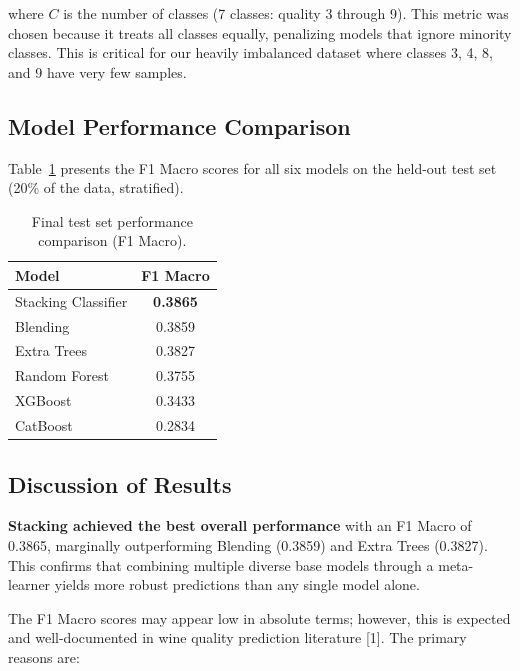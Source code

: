 \documentclass[12pt, a4paper]{article}
\begin{document}
where $C$ is the number of classes (7 classes: quality 3 through 9). This metric was chosen because it treats all classes equally, penalizing models that ignore minority classes. This is critical for our heavily imbalanced dataset where classes 3, 4, 8, and 9 have very few samples.

\subsection{Model Performance Comparison}

Table~\ref{tab:results} presents the F1 Macro scores for all six models on the held-out test set (20\% of the data, stratified).

\begin{table}[H]
\centering
\caption{Final test set performance comparison (F1 Macro).}
\label{tab:results}
\begin{tabular}{lc}
\toprule
\textbf{Model} & \textbf{F1 Macro} \\
\midrule
Stacking Classifier     & \textbf{0.3865} \\
Blending                & 0.3859 \\
Extra Trees             & 0.3827 \\
Random Forest           & 0.3755 \\
XGBoost                 & 0.3433 \\
CatBoost                & 0.2834 \\
\bottomrule
\end{tabular}
\end{table}

\subsection{Discussion of Results}

\textbf{Stacking achieved the best overall performance} with an F1 Macro of 0.3865, marginally outperforming Blending (0.3859) and Extra Trees (0.3827). This confirms that combining multiple diverse base models through a meta-learner yields more robust predictions than any single model alone.

The F1 Macro scores may appear low in absolute terms; however, this is expected and well-documented in wine quality prediction literature [1]. The primary reasons are:
\end{document}
